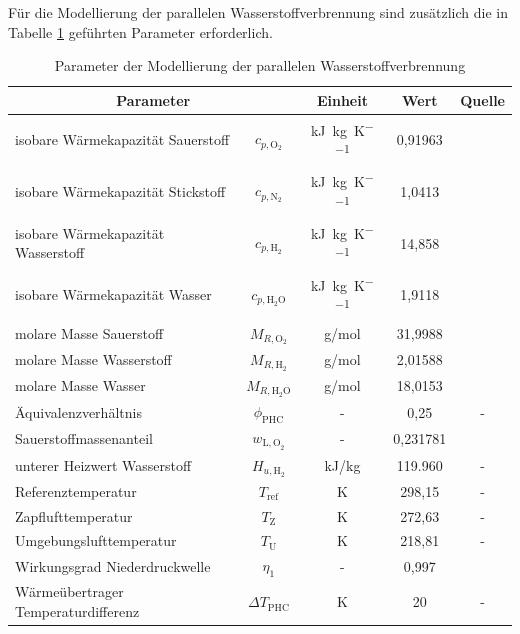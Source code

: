 Für die Modellierung der parallelen Wasserstoffverbrennung sind zusätzlich die in Tabelle \ref{Tab:phc_parametrisiert} geführten Parameter erforderlich.

\begin{table}[ht]
    \centering
	\caption{Parameter der Modellierung der parallelen Wasserstoffverbrennung}
	\begin{tabular} {|l|c|c|c|c|} \hline%
    \multicolumn{2}{|c|}{Parameter} & Einheit & Wert & Quelle\\ \hline\hline%
    isobare Wärmekapazität Sauerstoff & $c_{p, \mathrm{O}_2}$ & \si{\kilo\J\per\kg\per\K} & 0,91963 & \cite{NationalInstituteofStandardsandTechnology.2023} \\ \hline
    isobare Wärmekapazität Stickstoff & $c_{p, \mathrm{N}_2}$ & \si{\kilo\J\per\kg\per\K} & 1,0413 & \cite{NationalInstituteofStandardsandTechnology.2023} \\ \hline
    isobare Wärmekapazität Wasserstoff & $c_{p, \mathrm{H}_2}$ & \si{\kilo\J\per\kg\per\K} & 14,858 & \cite{NationalInstituteofStandardsandTechnology.2023} \\ \hline
    isobare Wärmekapazität Wasser & $c_{p, \mathrm{H}_2\mathrm{O}}$ & \si{\kilo\J\per\kg\per\K} & 1,9118 & \cite{NationalInstituteofStandardsandTechnology.2023} \\ \hline
    molare Masse Sauerstoff & $M_{R, \mathrm{O}_2}$ & g/mol & 31,9988 & \cite{NationalInstituteofStandardsandTechnology.2} \\ \hline
    molare Masse Wasserstoff & $M_{R, \mathrm{H}_2}$ & g/mol & 2,01588 & \cite{NationalInstituteofStandardsandTechnology.2} \\ \hline
    molare Masse Wasser & $M_{R, \mathrm{H}_2\mathrm{O}}$ & g/mol & 18,0153 & \cite{NationalInstituteofStandardsandTechnology.2} \\ \hline
    Äquivalenzverhältnis & $\phi_{\mathrm{PHC}}$ & - & 0,25 & - \\ \hline
    Sauerstoffmassenanteil & $w_{\mathrm{L,O}_2}$ & - & 0,231781 & \cite{NationalInstituteofStandardsandTechnology.n.d.} \\ \hline
    unterer Heizwert Wasserstoff & $H_{u, \mathrm{H}_2}$ & kJ/kg & 119.960 & - \\ \hline
    Referenztemperatur & $T_\mathrm{ref}$ & K & 298,15 & - \\ \hline
    Zapflufttemperatur & $T_\mathrm{Z}$ & K & 272,63 & - \\ \hline
    Umgebungslufttemperatur & $T_\mathrm{U}$ & K & 218,81 & - \\ \hline
    Wirkungsgrad Niederdruckwelle & $\eta_1$ & - & 0,997 & \cite{anonymous.1998} \\ \hline
    Wärmeübertrager Temperaturdifferenz & $\Delta T_\mathrm{PHC}$ & K & 20 & - \\ \hline    
	\end{tabular}	
    \label{Tab:phc_parametrisiert}%
\end{table}
\FloatBarrier 

